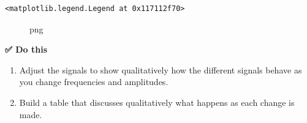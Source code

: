 \begin{Shaded}
\begin{Highlighting}[]
\OperatorTok{=}\OperatorTok{=}\NormalTok{(}\NormalTok{,}\NormalTok{))}


\OperatorTok{+}\OperatorTok{=}\NormalTok{)}
\OperatorTok{+}\OperatorTok{=}\NormalTok{)}
\OperatorTok{{-}}\OperatorTok{=}\NormalTok{)}
\OperatorTok{{-}}\OperatorTok{=}\NormalTok{)}

\end{Highlighting}
\end{Shaded}

\begin{verbatim}
<matplotlib.legend.Legend at 0x117112f70>
\end{verbatim}

\begin{figure}
\centering
{}
\caption{png}
\end{figure}

\textbf{✅ Do this}

\begin{enumerate}
\def\labelenumi{\arabic{enumi}.}
\tightlist
\item
  Adjust the signals to show qualitatively how the different signals
  behave as you change frequencies and amplitudes.
\item
  Build a table that discusses qualitatively what happens as each change
  is made.
\end{enumerate}

